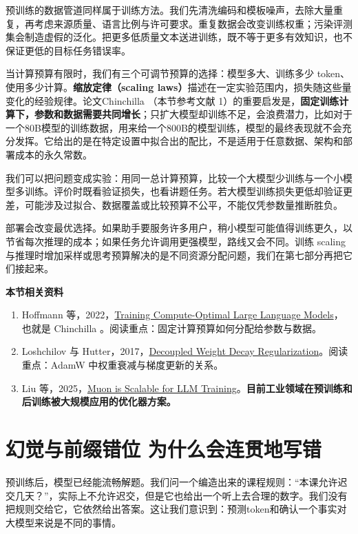 预训练的数据管道同样属于训练方法。我们先清洗编码和模板噪声，去除大量重复，再考虑来源质量、语言比例与许可要求。重复数据会改变训练权重；污染评测集会制造虚假的泛化。把更多低质量文本送进训练，既不等于更多有效知识，也不保证更低的目标任务错误率。

当计算预算有限时，我们有三个可调节预算的选择：模型多大、训练多少 token、使用多少计算。\textbf{缩放定律（scaling laws）}描述在一定实验范围内，损失随这些量变化的经验规律。论文Chinchilla （本节参考文献 1）的重要启发是，\textbf{固定训练计算下，参数和数据需要共同增长}；只扩大模型却训练不足，会浪费潜力，比如对于一个80B模型的训练数据，用来给一个800B的模型训练，模型的最终表现就不会充分发挥。它给出的是在特定设置中拟合出的配比，不是适用于任意数据、架构和部署成本的永久常数。

我们可以把问题变成实验：用同一总计算预算，比较一个大模型少训练与一个小模型多训练。评价时既看验证损失，也看讲题任务。若大模型训练损失更低却验证更差，可能涉及过拟合、数据覆盖或比较预算不公平，不能仅凭参数量推断胜负。

部署会改变最优选择。如果助手要服务许多用户，稍小模型可能值得训练更久，以节省每次推理的成本；如果任务允许调用更强模型，路线又会不同。训练 scaling 与推理时增加采样或思考预算解决的是不同资源分配问题，我们在第七部分再把它们接起来。

\textbf{本节相关资料}
\begin{enumerate}
    \item Hoffmann 等，2022，\href{https://arxiv.org/abs/2203.15556}{Training Compute-Optimal Large Language Models}，也就是 Chinchilla 。阅读重点：固定计算预算如何分配给参数与数据。
    \item Loshchilov 与 Hutter，2017，\href{https://arxiv.org/abs/1711.05101}{Decoupled Weight Decay Regularization}。阅读重点：AdamW 中权重衰减与梯度更新的关系。
    \item Liu 等，2025，\href{https://arxiv.org/abs/2502.16982}{Muon is Scalable for LLM Training}。\textbf{目前工业领域在预训练和后训练被大规模应用的优化器方案。}
\end{enumerate}

\section{幻觉与前缀错位 为什么会连贯地写错}\label{幻觉与前缀错位 为什么会连贯地写错}

预训练后，模型已经能流畅解题。我们问一个编造出来的课程规则：``本课允许迟交几天？''，实际上不允许迟交，但是它也给出一个听上去合理的数字。我们没有把规则交给它，它依然给出答案。这让我们意识到：预测token和确认一个事实对大模型来说是不同的事情。

